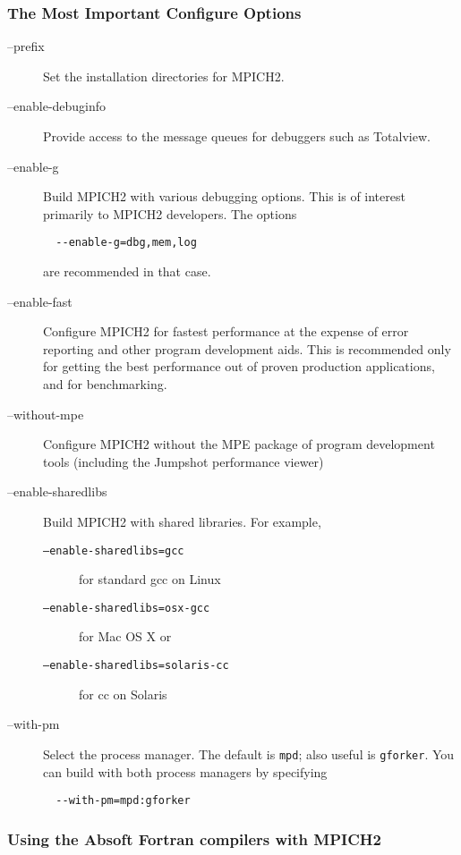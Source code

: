 \documentclass[dvipdfm,11pt]{article}
\begin{document}
\subsubsection{The Most Important Configure Options}
\label{sec:important-configure-options}
\begin{description}
\item[--prefix]Set the installation directories for MPICH2.  
\item[--enable-debuginfo]Provide access to the message queues for
  debuggers such as Totalview.
\item[--enable-g]Build MPICH2 with various debugging options.  This is
  of interest primarily to MPICH2 developers.  The options
\begin{verbatim}
  --enable-g=dbg,mem,log
\end{verbatim}
 are recommended in that case.
\item[--enable-fast]Configure MPICH2 for fastest performance at the
  expense of error reporting and other program development aids.  This
  is recommended only for getting the best performance out of proven
  production applications, and for benchmarking.
\item[--without-mpe]Configure MPICH2 without the MPE package of
  program development tools (including the Jumpshot performance viewer)
\item[--enable-sharedlibs]Build MPICH2 with shared libraries. 
  For example, 
\begin{description}
\item[\texttt{--enable-sharedlibs=gcc}]for standard gcc on Linux  
\item[\texttt{--enable-sharedlibs=osx-gcc}]for Mac OS X or
\item[\texttt{--enable-sharedlibs=solaris-cc}]for cc on Solaris
\end{description}
\item[--with-pm]Select the process manager.  The default is
  \texttt{mpd}; also useful is \texttt{gforker}.  You can build with
  both process managers by specifying
\begin{verbatim}
  --with-pm=mpd:gforker
\end{verbatim}
\end{description}


\subsubsection{Using the Absoft Fortran compilers with MPICH2}
\label{sec:absoft}
\end{document}
